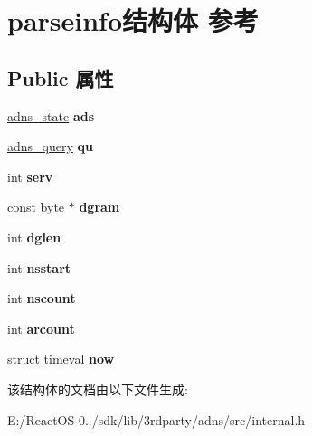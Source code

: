 \hypertarget{structparseinfo}{}\section{parseinfo结构体 参考}
\label{structparseinfo}
\subsection*{Public 属性}
\begin{DoxyCompactItemize}
\item 
\mbox{\label{structparseinfo_a78d829bcf66d41199ccef53604a6fbe0}} 
\hyperlink{structadns____state}{adns\+\_\+state} {\bfseries ads}
\item 
\mbox{\label{structparseinfo_a95964a34093bfa0f539ca830a3cd4da2}} 
\hyperlink{structadns____query}{adns\+\_\+query} {\bfseries qu}
\item 
\mbox{\label{structparseinfo_a2475ccc906e14af65c45f4323c95b787}} 
int {\bfseries serv}
\item 
\mbox{\label{structparseinfo_a31f947a90ff6f6dc37e0954d48b80fd4}} 
const byte $\ast$ {\bfseries dgram}
\item 
\mbox{\label{structparseinfo_afe998d66be22c57039897fc530d54ae5}} 
int {\bfseries dglen}
\item 
\mbox{\label{structparseinfo_a459e3796ff34f3fc16c88c910ea0e882}} 
int {\bfseries nsstart}
\item 
\mbox{\label{structparseinfo_a7d6e4567a51e54b2748e8afbeac8b40c}} 
int {\bfseries nscount}
\item 
\mbox{\label{structparseinfo_af850505400ffc47bedb7fdaea6d3e93d}} 
int {\bfseries arcount}
\item 
\mbox{\label{structparseinfo_a90bedfa3c81b8106a8760a84758db68e}} 
\hyperlink{interfacestruct}{struct} \hyperlink{structtimeval}{timeval} {\bfseries now}
\end{DoxyCompactItemize}


该结构体的文档由以下文件生成\+:\begin{DoxyCompactItemize}
\item 
E\+:/\+React\+O\+S-\/0../sdk/lib/3rdparty/adns/src/internal.\+h\end{DoxyCompactItemize}

